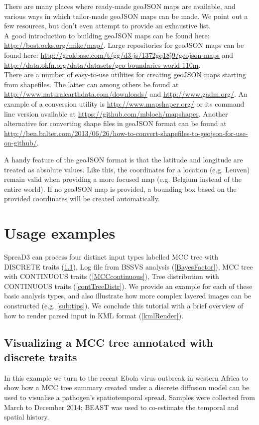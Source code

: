 \documentclass[english]{paper}
\begin{document}
There are many places where ready-made geoJSON maps are available, and various ways in which tailor-made geoJSON maps can be made. 
We point out a few resources, but don't even attempt to provide an exhaustive list.
\\
A good introduction to building geoJSON maps can be found here: \url{http://bost.ocks.org/mike/map/}.
Large repositories for geoJSON maps can be found here:
\url{http://grokbase.com/t/gg/d3-js/1372gq18j9/geojson-maps} and \url{http://data.okfn.org/data/datasets/geo-boundaries-world-110m}.
\\
There are a number of easy-to-use utilities for creating geoJSON maps starting from shapefiles. 
The latter can among others be found at \url{http://www.naturalearthdata.com/downloads/} and \url{http://www.gadm.org/}.
An example of a conversion utility is \url{http://www.mapshaper.org/} or its command line version available at \url{https://github.com/mbloch/mapshaper}.
Another alternative for converting shape files in geoJSON format can be found at \url{http://ben.balter.com/2013/06/26/how-to-convert-shapefiles-to-geojson-for-use-on-github/}.
\par
A handy feature of the geoJSON format is that the latitude and longitude are treated as absolute values.
Like this, the coordinates for a location (e.g. Leuven) remain valid when providing a more focused map (e.g. Belgium instead of the entire world).
If no geoJSON map is provided, a bounding box based on the provided coordinates will be created automatically.

\section{Usage examples}

SpreaD3 can process four distinct input types labelled MCC tree with DISCRETE traits (\ref{discrete}), Log file from BSSVS analysis (\ref{BayesFactor}), MCC tree with CONTINUOUS traits (\ref{MCCcontinuous}), Tree distribution with CONTINUOUS traits (\ref{contTreeDistr}). 
We provide an example for each of these basic analysis types, and also illustrate how more complex layered images can be constructed (e.g. \ref{sub:tips}). 
We conclude this tutorial with a brief overview of how to render parsed input in KML format (\ref{kmlRender}).

\subsection{Visualizing a MCC tree annotated with discrete traits}
\label{discrete}
In this example we turn to the recent Ebola virus outbreak in western Africa to show how a MCC tree summary created under a discrete diffusion model \citep{lemey:2009fk} can be used to visualise a pathogen's spatiotemporal spread. 
Samples were collected from March to December 2014; BEAST \citep{drummond:2012zr} was used to co-estimate the temporal and spatial history. 
\end{document}
